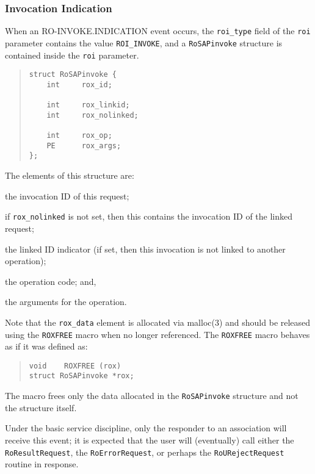 \subsubsection  {Invocation Indication}
When an {\sf RO-INVOKE.INDICATION\/} event occurs,
the \verb"roi_type" field of the \verb"roi" parameter contains the value
\verb"ROI_INVOKE",
and a \verb"RoSAPinvoke" structure is contained inside the \verb"roi"
parameter.
\begin{quote}\small\begin{verbatim}
struct RoSAPinvoke {
    int     rox_id;

    int     rox_linkid;
    int     rox_nolinked;

    int     rox_op;
    PE      rox_args;
};
\end{verbatim}\end{quote}
The elements of this structure are:
\begin{describe}
\item[\verb"rox\_id":] the invocation ID of this request;

\item[\verb"rox\_linkid":] if \verb"rox_nolinked" is not set,
then this contains the invocation ID of the linked request;

\item[\verb"rox\_nolinked":] the linked ID indicator
(if set, then this invocation is not linked to another operation);

\item[\verb"rox\_op":] the operation code;
and,

\item[\verb"rox\_args":] the arguments for the operation.
\end{describe}
Note that the \verb"rox_data" element is allocated via \man malloc(3) and
should be released using the \verb"ROXFREE" macro  when no longer referenced.
The \verb"ROXFREE" macro behaves as if it was defined as:
\begin{quote}\small\begin{verbatim}
void    ROXFREE (rox)
struct RoSAPinvoke *rox;
\end{verbatim}\end{quote}
The macro frees only the data allocated in the \verb"RoSAPinvoke" structure
and not the structure itself.

Under the basic service discipline,
only the responder to an association will receive this event;
it is expected that the user will (eventually) call either
the \verb"RoResultRequest", the \verb"RoErrorRequest",
or perhaps the \verb"RoURejectRequest" routine in response.

